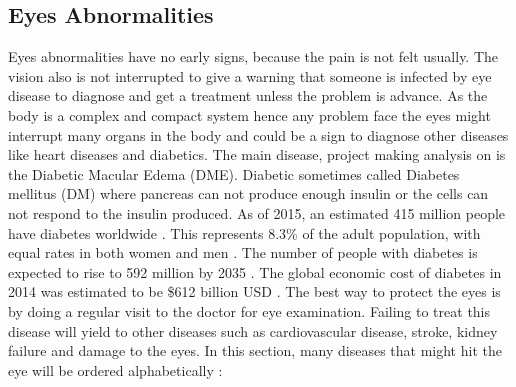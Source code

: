 \subsection{Eyes Abnormalities}
Eyes abnormalities have no early signs, because the pain is not felt usually.
The vision also is not interrupted to give a warning that someone is infected by eye disease to diagnose and get a treatment unless the problem is advance. 
As the body is a complex and compact system hence any problem face the eyes might interrupt many organs in the body and could be a sign to diagnose other diseases like heart diseases and diabetics.
The main disease, project making analysis on is the Diabetic Macular Edema (DME).
Diabetic sometimes called Diabetes mellitus (DM) where pancreas can not produce enough insulin or the cells can not respond to the insulin produced.
As of 2015, an estimated 415 million people have diabetes worldwide \cite{fernandez2010obesity}.
This represents 8.3\% of the adult population, with equal rates in both women and men \cite{vos2013years}.
The number of people with diabetes is expected to rise to 592 million by 2035 \cite{beagley2014global}.
The global economic cost of diabetes in 2014 was estimated to be \$612 billion USD \cite{atlas2013international}.
The best way to protect the eyes is by doing a regular visit to the doctor for eye examination.
Failing to treat this disease will yield to other diseases such as  cardiovascular disease, stroke, kidney failure and damage to the eyes.
In this section, many diseases that might hit the eye will be ordered alphabetically :
